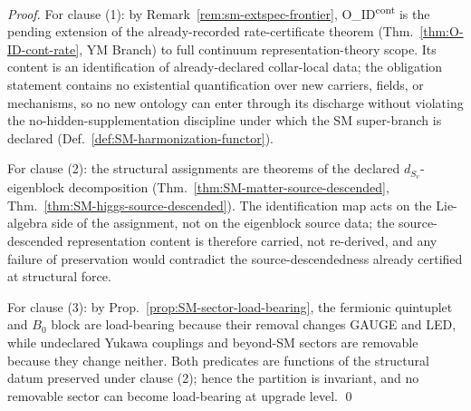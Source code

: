 \documentclass[12pt,oneside]{amsbook}
\theoremstyle{plain}
\theoremstyle{definition}
\theoremstyle{remark}
\begin{document}
\begin{proof}
For clause (1): by Remark~\ref{rem:sm-extspec-frontier},
O\_ID\textsuperscript{cont} is the pending extension of the
already-recorded rate-certificate theorem
(Thm.~\ref{thm:O-ID-cont-rate}, YM Branch) to full continuum
representation-theory scope. Its content is an identification of
already-declared collar-local data; the obligation statement
contains no existential quantification over new carriers, fields,
or mechanisms, so no new ontology can enter through its discharge
without violating the no-hidden-supplementation discipline under
which the SM super-branch is declared
(Def.~\ref{def:SM-harmonization-functor}).

For clause (2): the structural assignments are theorems of the
declared $d_{S_v}$-eigenblock decomposition
(Thm.~\ref{thm:SM-matter-source-descended},
Thm.~\ref{thm:SM-higgs-source-descended}). The identification map
acts on the Lie-algebra side of the assignment, not on the
eigenblock source data; the source-descended representation
content is therefore carried, not re-derived, and any failure of
preservation would contradict the source-descendedness already
certified at structural force.

For clause (3): by Prop.~\ref{prop:SM-sector-load-bearing}, the
fermionic quintuplet and $B_0$ block are load-bearing because their
removal changes GAUGE and LED, while undeclared Yukawa couplings
and beyond-SM sectors are removable because they change neither.
Both predicates are functions of the structural datum preserved
under clause (2); hence the partition is invariant, and no
removable sector can become load-bearing at upgrade level.
\qed
\end{proof}
\end{document}
